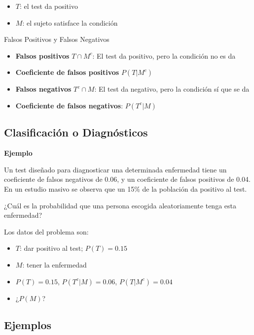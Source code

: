 \documentclass[]{book}
\providecommand{\tightlist}{%
  \setlength{\itemsep}{0pt}\setlength{\parskip}{0pt}}
\begin{document}
\begin{itemize}
\tightlist
\item
  \(T\): el test da positivo
\item
  \(M\): el sujeto satisface la condición
\end{itemize}

 Falsos Positivos y Falsos Negativos

\begin{itemize}
\tightlist
\item
  \textbf{Falsos positivos} \(T\cap M^c\): El test da positivo, pero la condición no es da
\item
  \textbf{Coeficiente de falsos positivos} \(P(T|M^c)\)
\item
  \textbf{Falsos negativos} \(T^c\cap M\): El test da negativo, pero la condición sí que se da
\item
  \textbf{Coeficiente de falsos negativos}: \(P(T^c|M)\)
\end{itemize}

\hypertarget{clasificaciuxf3n-o-diagnuxf3sticos-7}{%
\subsection{Clasificación o Diagnósticos}\label{clasificaciuxf3n-o-diagnuxf3sticos-7}}

\textbf{Ejemplo}

Un test diseñado para diagnosticar una determinada enfermedad tiene un coeficiente de falsos negativos de 0.06, y un coeficiente de falsos positivos de 0.04. En un estudio masivo se observa que un 15\% de la población da positivo al test.

¿Cuál es la probabilidad que una persona escogida aleatoriamente tenga esta enfermedad?

Los datos del problema son:

\begin{itemize}
\tightlist
\item
  \(T\): dar positivo al test; \(P(T)=0.15\)
\item
  \(M\): tener la enfermedad
\item
  \(P(T)=0.15\), \(P(T^c|M)=0.06\), \(P(T|M^c)=0.04\)
\item
  ¿\(P(M)\)?
\end{itemize}

\hypertarget{ejemplos-5}{%
\subsection{Ejemplos}\label{ejemplos-5}}
\end{document}
